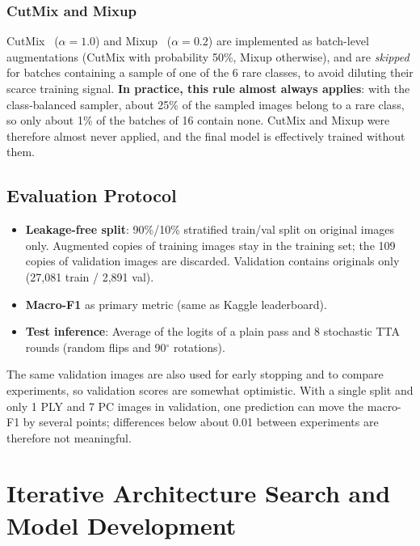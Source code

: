 \documentclass[twocolumn,a4paper]{article}
\begin{document}
\subsubsection{CutMix and Mixup}

CutMix~\cite{yun2019cutmix} ($\alpha=1.0$) and Mixup~\cite{zhang2018mixup} ($\alpha=0.2$) are implemented as batch-level augmentations (CutMix with probability 50\%, Mixup otherwise), and are \textit{skipped} for batches containing a sample of one of the 6 rare classes, to avoid diluting their scarce training signal. \textbf{In practice, this rule almost always applies}: with the class-balanced sampler, about 25\% of the sampled images belong to a rare class, so only about 1\% of the batches of 16 contain none. CutMix and Mixup were therefore almost never applied, and the final model is effectively trained without them.

\subsection{Evaluation Protocol}
\label{sec:eval}

\begin{itemize}
    \item \textbf{Leakage-free split}: 90\%/10\% stratified train/val split on original images only. Augmented copies of training images stay in the training set; the 109 copies of validation images are discarded. Validation contains originals only (27,081 train / 2,891 val).
    \item \textbf{Macro-F1} as primary metric (same as Kaggle leaderboard).
    \item \textbf{Test inference}: Average of the logits of a plain pass and 8 stochastic TTA rounds (random flips and 90$^\circ$ rotations).
\end{itemize}

The same validation images are also used for early stopping and to compare experiments, so validation scores are somewhat optimistic. With a single split and only 1 PLY and 7 PC images in validation, one prediction can move the macro-F1 by several points; differences below about 0.01 between experiments are therefore not meaningful.

\section{Iterative Architecture Search and Model Development}
\label{sec:iterations}
\end{document}
